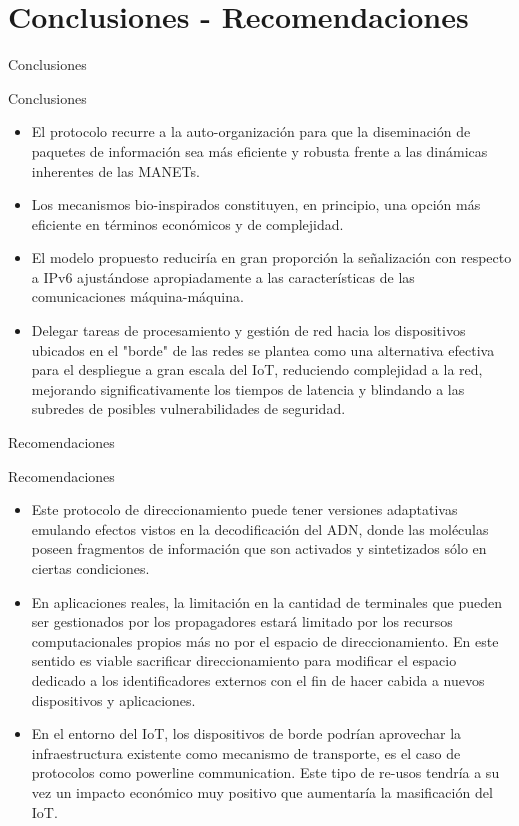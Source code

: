 \section{Conclusiones - Recomendaciones}
\begin{frame}{Conclusiones}
  \begin{block}{Conclusiones}
   \begin{itemize}
   \justifying
    \item<1->  El protocolo recurre a la auto-organización para que la diseminación de paquetes de información sea más eficiente y robusta frente a las dinámicas inherentes de las MANETs.
    \item<1->  Los mecanismos bio-inspirados constituyen, en principio, una opción más eficiente en términos económicos y de complejidad.
    \item<1->  El modelo propuesto reduciría en gran proporción la señalización con respecto a IPv6 ajustándose apropiadamente a las características de las comunicaciones máquina-máquina.
    \item<1->  Delegar tareas de procesamiento y gestión de red hacia los dispositivos ubicados en el "borde" de las redes se plantea como una alternativa efectiva para el despliegue a gran escala del IoT, reduciendo complejidad a la red, mejorando significativamente los tiempos de latencia y blindando a las subredes de posibles vulnerabilidades de seguridad.
    \end{itemize}
  \end{block}
\end{frame}
\begin{frame}{Recomendaciones}
  \begin{block}{Recomendaciones}
   \begin{itemize}
   \justifying
    \item<1->  Este protocolo de direccionamiento puede tener versiones adaptativas emulando efectos vistos en la decodificación del ADN, donde las moléculas poseen fragmentos de información que son activados y sintetizados sólo en ciertas condiciones.
    \item<1->  En aplicaciones reales, la limitación en la cantidad de terminales que pueden ser gestionados por los propagadores estará limitado por los recursos computacionales propios más no por el espacio de direccionamiento. En este sentido es viable sacrificar direccionamiento para modificar el espacio dedicado a los identificadores externos con el fin de hacer cabida a nuevos dispositivos y aplicaciones.
    \item<1-> En el entorno del IoT, los dispositivos de borde podrían aprovechar la infraestructura existente como mecanismo de transporte, es el caso de protocolos como powerline communication. Este tipo de re-usos tendría a su vez un impacto económico muy positivo que aumentaría la masificación del IoT.  
    \end{itemize}
  \end{block}
\end{frame}